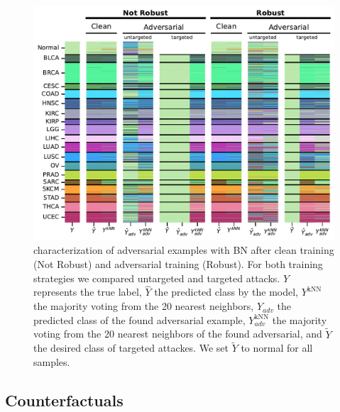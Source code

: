 \documentclass[../main.tex]{subfiles}
\begin{document}
		\begin{figure}[htbp]
			\centering
			\includegraphics[width=\textwidth]{MLP_BN_knn_comparison.pdf}
			\caption[ characterization of adversarial examples with  BN]{ characterization of adversarial examples with  BN after clean training (Not Robust) and adversarial training (Robust). For both training strategies we compared untargeted and targeted attacks. \(Y\) represents the true label, \(\hat{Y}\) the predicted class by the model, \(Y^{\text{kNN}}\) the majority voting from the 20 nearest neighbors, \(\hat{Y}_{adv}\) the predicted class of the found adversarial example, \(Y^{\text{kNN}}_{adv}\) the majority voting from the 20 nearest neighbors of the found adversarial, and \(\tilde{Y}\) the desired class of targeted attackes. We set \(\tilde{Y}\) to normal for all samples.}\label{fig:mlp_bn_knn_comp}
		\end{figure}

	\subsection{Counterfactuals}
\end{document}
